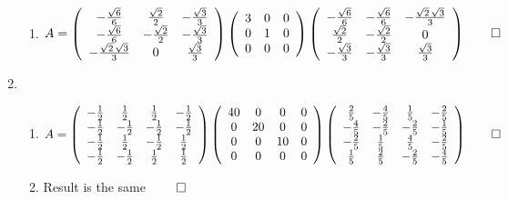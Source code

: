 \documentclass[12pt, a4paper]{article}
\begin{document}
\begin{enumerate}[Q\arabic*.]
\begin{enumerate}[(\alph*)]
      \item $A = \left(\begin{array}{ccc} -\frac{\sqrt{6}}{6} & \frac{\sqrt{2}}{2} & -\frac{\sqrt{3}}{3}\\ -\frac{\sqrt{6}}{6} & -\frac{\sqrt{2}}{2} & -\frac{\sqrt{3}}{3}\\ -\frac{\sqrt{2}\,\sqrt{3}}{3} & 0 & \frac{\sqrt{3}}{3} \end{array}\right) \left(\begin{array}{ccc} 3 & 0 & 0\\ 0 & 1 & 0\\ 0 & 0 & 0 \end{array}\right) \left(\begin{array}{ccc} -\frac{\sqrt{6}}{6} & -\frac{\sqrt{6}}{6} & -\frac{\sqrt{2}\,\sqrt{3}}{3}\\ \frac{\sqrt{2}}{2} & -\frac{\sqrt{2}}{2} & 0\\ -\frac{\sqrt{3}}{3} & -\frac{\sqrt{3}}{3} & \frac{\sqrt{3}}{3} \end{array}\right) \qed$ 
    \end{enumerate}

  \item 
    \begin{enumerate}[(\alph*)]
      \item $A = \left(\begin{array}{cccc} -\frac{1}{2} & \frac{1}{2} & \frac{1}{2} & -\frac{1}{2}\\ -\frac{1}{2} & -\frac{1}{2} & -\frac{1}{2} & -\frac{1}{2}\\ -\frac{1}{2} & \frac{1}{2} & -\frac{1}{2} & \frac{1}{2}\\ -\frac{1}{2} & -\frac{1}{2} & \frac{1}{2} & \frac{1}{2} \end{array}\right) \left(\begin{array}{cccc} 40 & 0 & 0 & 0\\ 0 & 20 & 0 & 0\\ 0 & 0 & 10 & 0\\ 0 & 0 & 0 & 0 \end{array}\right) \left(\begin{array}{cccc} \frac{2}{5} & -\frac{4}{5} & \frac{1}{5} & -\frac{2}{5}\\ -\frac{4}{5} & -\frac{2}{5} & -\frac{2}{5} & -\frac{1}{5}\\ -\frac{2}{5} & \frac{1}{5} & \frac{4}{5} & -\frac{2}{5}\\ \frac{1}{5} & \frac{2}{5} & -\frac{2}{5} & -\frac{4}{5} \end{array}\right) \qed$

      \item Result is the same $\qed$
    \end{enumerate}
\end{enumerate}
\end{document}
